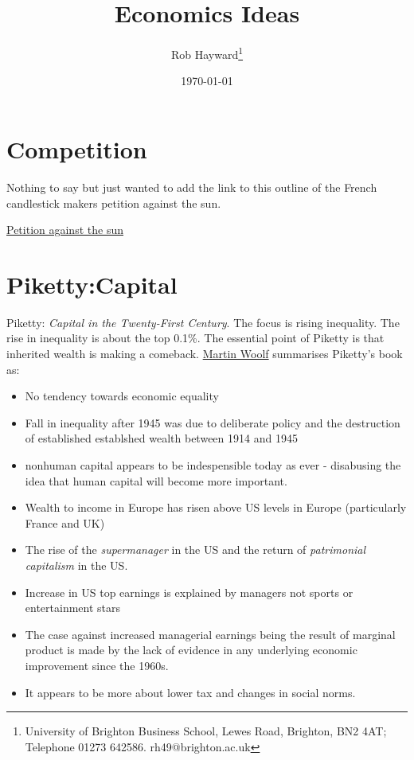 \documentclass[12pt, a4paper, oneside]{article} %
\begin{document}
\title{Economics Ideas}
\author{Rob Hayward\footnote{University of Brighton Business School, Lewes Road, Brighton, BN2 4AT; Telephone 01273 642586.  rh49@brighton.ac.uk}}
\date{\today}
\maketitle

\section*{Competition}
Nothing to say but just wanted to add the link to this outline of the French candlestick makers petition against the sun.

\href{http://bastiat.org/en/petition.html}{Petition against the sun}


\section*{Piketty:Capital}
Piketty:  \emph{Capital in the Twenty-First Century}.  The focus is rising inequality.  The rise in inequality is about the top 0.1\%.  The essential point of Piketty is that inherited wealth is making a comeback.  \href{http://www.ft.com/cms/s/2/0c6e9302-c3e2-11e3-a8e0-00144feabdc0.html#axzz2z7YbuMqh}{Martin Woolf} summarises Piketty's book as:
\begin{itemize}
\item No tendency towards economic equality
\item Fall in inequality after 1945 was due to deliberate policy and the destruction of established establshed wealth between 1914 and 1945
\item nonhuman capital appears to be indespensible today as ever - disabusing the idea that human capital will become more important.
\item Wealth to income in Europe has risen above US levels in Europe (particularly France and UK)
\item The rise of the \emph{supermanager} in the US and the return of \emph{patrimonial capitalism} in the US.
\item Increase in US top earnings is explained by managers not sports or entertainment stars
\item The case against increased managerial earnings being the result of marginal product is made by the lack of evidence in any underlying economic improvement since the 1960s.  
\item It appears to be more about lower tax and changes in social norms.
\end{itemize}
\end{document}
